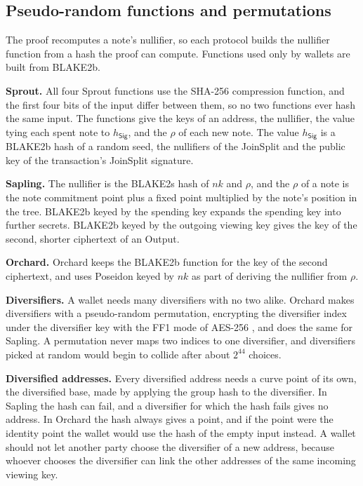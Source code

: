 \documentclass{article}
\let\oldcite\cite
\renewcommand{\cite}[2][]{\raisebox{0ex}{\oldcite[{#1}]{#2}}}
\newcommand{\lsubsection}[2]{\def\sectionlabel{#2} \subsection{#1}\label{#2}}
\theoremstyle{labelledtheorem} %
\begin{document}
\lsubsection{Pseudo-random functions and permutations}{readableprfs}
\label{concreteprfs}%

The proof recomputes a note's nullifier, so each protocol builds the nullifier function from a hash the proof can compute. Functions used only by wallets are built from BLAKE2b.

\textbf{Sprout.} All four Sprout functions use the SHA-256 compression function, and the first four bits of the input differ between them, so no two functions ever hash the same input. The functions give the keys of an address, the nullifier, the value tying each spent note to $h_{\mathsf{Sig}}$, and the $\rho$ of each new note. The value $h_{\mathsf{Sig}}$ is a BLAKE2b hash of a random seed, the nullifiers of the JoinSplit and the public key of the transaction's JoinSplit signature.

\textbf{Sapling.} The nullifier is the BLAKE2s hash of $\mathit{nk}$ and $\rho$, and the $\rho$ of a note is the note commitment point plus a fixed point multiplied by the note's position in the tree. BLAKE2b keyed by the spending key expands the spending key into further secrets. BLAKE2b keyed by the outgoing viewing key gives the key of the second, shorter ciphertext of an Output.

\textbf{Orchard.} Orchard keeps the BLAKE2b function for the key of the second ciphertext, and uses Poseidon keyed by $\mathit{nk}$ as part of deriving the nullifier from $\rho$.

\textbf{Diversifiers.} A wallet needs many diversifiers with no two alike. Orchard makes diversifiers with a pseudo-random permutation, encrypting the diversifier index under the diversifier key with the FF1 mode of AES-256 \cite{NIST2016}, and \cite{ZIP-32} does the same for Sapling. A permutation never maps two indices to one diversifier, and diversifiers picked at random would begin to collide after about $2^{44}$ choices.

\textbf{Diversified addresses.} Every diversified address needs a curve point of its own, the diversified base, made by applying the group hash to the diversifier. In Sapling the hash can fail, and a diversifier for which the hash fails gives no address. In Orchard the hash always gives a point, and if the point were the identity point the wallet would use the hash of the empty input instead. A wallet should not let another party choose the diversifier of a new address, because whoever chooses the diversifier can link the other addresses of the same incoming viewing key.
\end{document}
